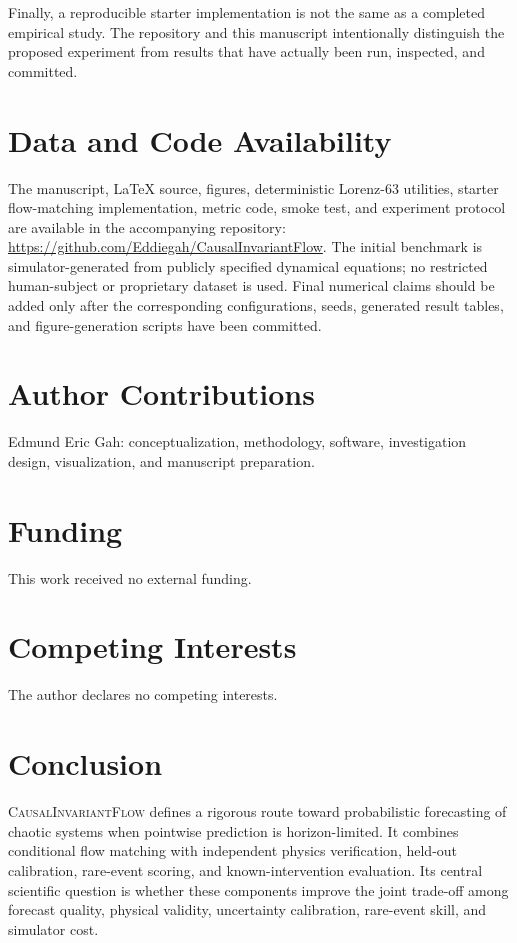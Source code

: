 \documentclass[11pt]{article}
\newcommand{\method}{\textsc{CausalInvariantFlow}}
\begin{document}
Finally, a reproducible starter implementation is not the same as a completed empirical study. The repository and this manuscript intentionally distinguish the proposed experiment from results that have actually been run, inspected, and committed.

\section*{Data and Code Availability}

The manuscript, LaTeX source, figures, deterministic Lorenz-63 utilities, starter flow-matching implementation, metric code, smoke test, and experiment protocol are available in the accompanying repository: \url{https://github.com/Eddiegah/CausalInvariantFlow}. The initial benchmark is simulator-generated from publicly specified dynamical equations; no restricted human-subject or proprietary dataset is used. Final numerical claims should be added only after the corresponding configurations, seeds, generated result tables, and figure-generation scripts have been committed.

\section*{Author Contributions}

Edmund Eric Gah: conceptualization, methodology, software, investigation design, visualization, and manuscript preparation.

\section*{Funding}

This work received no external funding.

\section*{Competing Interests}

The author declares no competing interests.

\section{Conclusion}

\method{} defines a rigorous route toward probabilistic forecasting of chaotic systems when pointwise prediction is horizon-limited. It combines conditional flow matching with independent physics verification, held-out calibration, rare-event scoring, and known-intervention evaluation. Its central scientific question is whether these components improve the joint trade-off among forecast quality, physical validity, uncertainty calibration, rare-event skill, and simulator cost.
\end{document}
